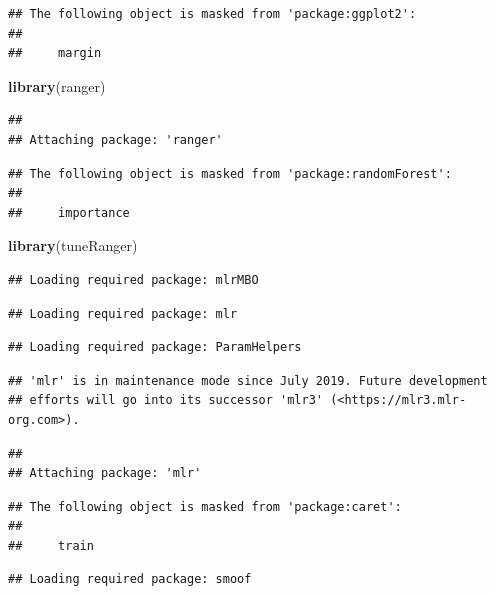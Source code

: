 \documentclass[
]{article}
\newenvironment{Shaded}{\begin{snugshade}}{\end{snugshade}}
\newcommand{\KeywordTok}[1]{\textcolor[rgb]{0.13,0.29,0.53}{\textbf{#1}}}
\newcommand{\NormalTok}[1]{#1}
\begin{document}
\begin{verbatim}
## The following object is masked from 'package:ggplot2':
## 
##     margin
\end{verbatim}

\begin{Shaded}
\begin{Highlighting}[]
\KeywordTok{library}\NormalTok{(ranger)}
\end{Highlighting}
\end{Shaded}

\begin{verbatim}
## 
## Attaching package: 'ranger'
\end{verbatim}

\begin{verbatim}
## The following object is masked from 'package:randomForest':
## 
##     importance
\end{verbatim}

\begin{Shaded}
\begin{Highlighting}[]
\KeywordTok{library}\NormalTok{(tuneRanger)}
\end{Highlighting}
\end{Shaded}

\begin{verbatim}
## Loading required package: mlrMBO
\end{verbatim}

\begin{verbatim}
## Loading required package: mlr
\end{verbatim}

\begin{verbatim}
## Loading required package: ParamHelpers
\end{verbatim}

\begin{verbatim}
## 'mlr' is in maintenance mode since July 2019. Future development
## efforts will go into its successor 'mlr3' (<https://mlr3.mlr-org.com>).
\end{verbatim}

\begin{verbatim}
## 
## Attaching package: 'mlr'
\end{verbatim}

\begin{verbatim}
## The following object is masked from 'package:caret':
## 
##     train
\end{verbatim}

\begin{verbatim}
## Loading required package: smoof
\end{verbatim}
\end{document}
